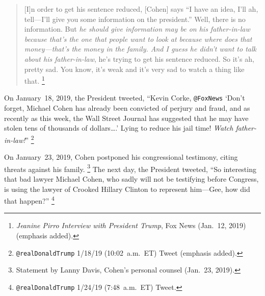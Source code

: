 \begin{quote}
[I]n order to get his sentence reduced, [Cohen] says ``I have an idea, I'll ah, tell---I'll give you some information on the president.''
Well, there is no information.
But \textit{he should give information may be on his father-in-law because that's the one that people want to look at because where does that money---that's the money in the family.
And I guess he didn't want to talk about his father-in-law}, he's trying to get his sentence reduced.
So it's ah, pretty sad.
You know, it's weak and it's very sad to watch a thing like that.%
\footnote{\textit{Jeanine Pirro Interview with President Trump}, Fox News (Jan.~12, 2019) (emphasis added).}
\end{quote}

On January~18, 2019, the President tweeted, ``Kevin Corke, \verb+@FoxNews+ `Don't forget, Michael Cohen has already been convicted of perjury and fraud, and as recently as this week, the Wall Street Journal has suggested that he may have stolen tens of thousands of dollars\dots.' Lying to reduce his jail time! \textit{Watch father-in-law!}''%
\footnote{\verb+@realDonaldTrump+ 1/18/19 (10:02~a.m.~ET) Tweet (emphasis added).}

On January~23, 2019, Cohen postponed his congressional testimony, citing threats against his family.%
\footnote{Statement by Lanny Davis, Cohen's personal counsel (Jan.~23, 2019).}
The next day, the President tweeted, ``So interesting that bad lawyer Michael Cohen, who sadly will not be testifying before Congress, is using the lawyer of Crooked Hillary Clinton to represent him---Gee, how did that happen?''%
\footnote{\verb+@realDonaldTrump+ 1/24/19 (7:48~a.m.~ET) Tweet.}

